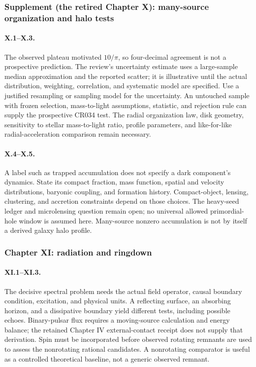 \subsubsection*{Supplement (the retired Chapter X): many-source organization and halo tests}

\paragraph{X.1--X.3.}
The observed plateau motivated $10/\pi$, so four-decimal agreement is not a prospective prediction. The review's uncertainty estimate uses a large-sample median approximation and the reported scatter; it is illustrative until the actual distribution, weighting, correlation, and systematic model are specified. Use a justified resampling or sampling model for the uncertainty. An untouched sample with frozen selection, mass-to-light assumptions, statistic, and rejection rule can supply the prospective CR034 test. The radial organization law, disk geometry, sensitivity to stellar mass-to-light ratio, profile parameters, and like-for-like radial-acceleration comparison remain necessary.

\paragraph{X.4--X.5.}
A label such as trapped accumulation does not specify a dark component's dynamics. State its compact fraction, mass function, spatial and velocity distributions, baryonic coupling, and formation history. Compact-object, lensing, clustering, and accretion constraints depend on those choices. The heavy-seed ledger and microlensing question remain open; no universal allowed primordial-hole window is assumed here. Many-source nonzero accumulation is not by itself a derived galaxy halo profile.

\subsubsection*{Chapter XI: radiation and ringdown}

\paragraph{XI.1--XI.3.}
The decisive spectral problem needs the actual field operator, causal boundary condition, excitation, and physical units. A reflecting surface, an absorbing horizon, and a dissipative boundary yield different tests, including possible echoes. Binary-pulsar flux requires a moving-source calculation and energy balance; the retained Chapter IV external-contact receipt does not supply that derivation. Spin must be incorporated before observed rotating remnants are used to assess the nonrotating rational candidates. A nonrotating comparator is useful as a controlled theoretical baseline, not a generic observed remnant.


